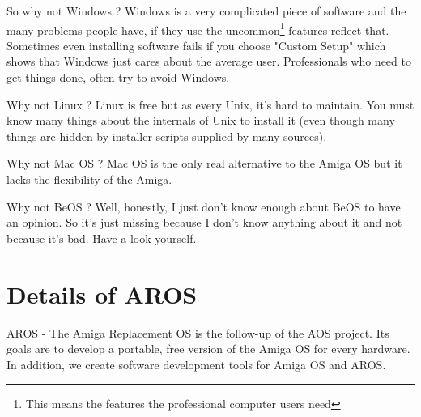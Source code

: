 So why not Windows ? Windows is a very complicated piece of software and the many
problems people have, if they use the uncommon\footnote{This means the
features the professional computer users need} features reflect that.
Sometimes even installing software fails if you choose "Custom Setup" which
shows that Windows just cares about the average user. Professionals who
need to get things done, often try to avoid Windows.

Why not Linux ? Linux is free but as every Unix, it's hard to maintain.
You must know many things about the internals of Unix to install it
(even though many things are hidden by installer scripts supplied by many
sources).

Why not Mac OS ? Mac OS is the only real alternative to the Amiga OS but it
lacks the flexibility of the Amiga.

Why not BeOS ? Well, honestly, I just don't know enough about BeOS
to have an opinion. So it's just missing because I don't know anything
about it and not because it's bad. Have a look yourself.

\section{Details of AROS}

AROS - The Amiga Replacement OS is the follow-up of the AOS project.
Its goals are to develop a portable, free version of the Amiga OS for
every hardware. In addition, we create software development tools for
Amiga OS and AROS.

